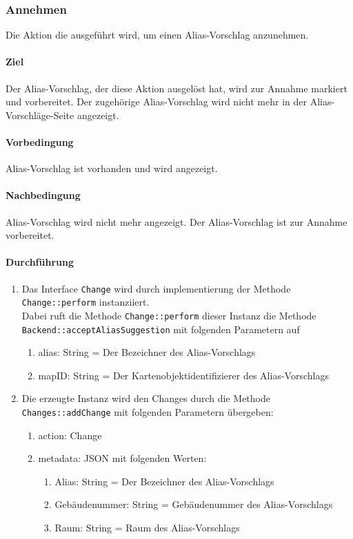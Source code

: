 \subsubsection{Annehmen}\label{AP_Aktionen_Alias_Vorschläge_Annehmen}

Die Aktion die ausgeführt wird, um einen Alias-Vorschlag anzunehmen.

\paragraph*{Ziel}
Der Alias-Vorschlag, der diese Aktion ausgelöst hat, wird zur Annahme markiert und vorbereitet.
Der zugehörige Alias-Vorschlag wird nicht mehr in der Alias-Vorschläge-Seite angezeigt.

\paragraph*{Vorbedingung}
Alias-Vorschlag ist vorhanden und wird angezeigt.

\paragraph*{Nachbedingung}
Alias-Vorschlag wird nicht mehr angezeigt. Der Alias-Vorschlag ist zur Annahme vorbereitet.

\paragraph*{Durchführung}
\begin{enumerate}
    \item Das Interface \verb#Change# wird durch implementierung der Methode \verb#Change::perform# instanziiert. \\
          Dabei ruft die Methode \verb#Change::perform# dieser Instanz die Methode \verb#Backend::acceptAliasSuggestion# mit folgenden Parametern auf \begin{enumerate}
              \item alias: String = Der Bezeichner des Alias-Vorschlags
              \item mapID: String = Der Kartenobjektidentifizierer des Alias-Vorschlags
          \end{enumerate}
    \item Die erzeugte Instanz wird den Changes durch die Methode \verb#Changes::addChange# mit folgenden Parametern übergeben: \begin{enumerate}
        \item action: Change
        \item metadata: JSON mit folgenden Werten: \begin{enumerate}
            \item Alias: String = Der Bezeichner des Alias-Vorschlags
            \item Gebäudenummer: String = Gebäudenummer des Alias-Vorschlags
            \item Raum: String = Raum des Alias-Vorschlags
        \end{enumerate}
    \end{enumerate}
\end{enumerate}